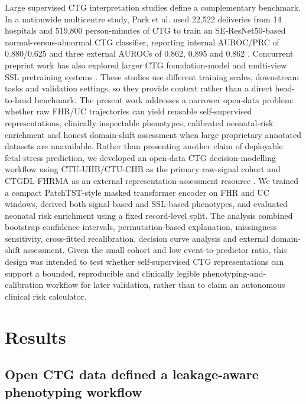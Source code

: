 \documentclass[utf8]{FrontiersinHarvard}
\begin{document}
Large supervised CTG interpretation studies define a complementary benchmark. In a nationwide multicentre study, Park et al. used 22,522 deliveries from 14 hospitals and 519,800 person-minutes of CTG to train an SE-ResNet50-based normal-versus-abnormal CTG classifier, reporting internal AUROC/PRC of 0.880/0.625 and three external AUROCs of 0.862, 0.895 and 0.862 \citep{park2025nationwide}. Concurrent preprint work has also explored larger CTG foundation-model and multi-view SSL pretraining systems \citep{fridman2026ctgfoundation,prismctg2026}. These studies use different training scales, downstream tasks and validation settings, so they provide context rather than a direct head-to-head benchmark. The present work addresses a narrower open-data problem: whether raw FHR/UC trajectories can yield reusable self-supervised representations, clinically inspectable phenotypes, calibrated neonatal-risk enrichment and honest domain-shift assessment when large proprietary annotated datasets are unavailable. Rather than presenting another claim of deployable fetal-stress prediction, we developed an open-data CTG decision-modelling workflow using CTU-UHB/CTU-CHB as the primary raw-signal cohort and CTGDL-FHRMA as an external representation-assessment resource \citep{goldberger2000,chudacek2014,ctuuhb,ctgdl}. We trained a compact PatchTST-style masked transformer encoder on FHR and UC windows, derived both signal-based and SSL-based phenotypes, and evaluated neonatal risk enrichment using a fixed record-level split. The analysis combined bootstrap confidence intervals, permutation-based explanation, missingness sensitivity, cross-fitted recalibration, decision curve analysis and external domain-shift assessment. Given the small cohort and low event-to-predictor ratio, this design was intended to test whether self-supervised CTG representations can support a bounded, reproducible and clinically legible phenotyping-and-calibration workflow for later validation, rather than to claim an autonomous clinical risk calculator.

\section{Results}

\subsection{Open CTG data defined a leakage-aware phenotyping workflow}
\end{document}
